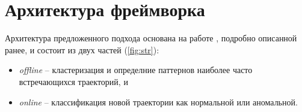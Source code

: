 
\section{Архитектура фреймворка}

Архитектура предложенного подхода основана на работе \cite{inproceedings:7_related_work}, подробно описанной ранее, и состоит из двух частей (\ref{fig:str}):

\begin{itemize}
	\item \textit{offline} -- кластеризация и определние паттернов наиболее часто встречающихся траекторий, и
	\item \textit{online} -- классификация новой траектории как нормальной или аномальной.
\end{itemize}


